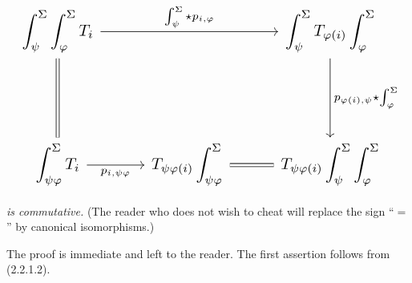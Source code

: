 \begin{equation*}
  \resizebox{\textwidth}{!}{%
    $\begin{tikzcd}[ampersand replacement=\&,column sep=2.8em,row sep=5.0em]
      \displaystyle\int_\psi^\Sigma\int_\varphi^\Sigma T_i
        \arrow[rr,"{\int_\psi^\Sigma\star p_{i,\varphi}}"]
        \arrow[d,equal]
        \& {}
        \& \displaystyle\int_\psi^\Sigma T_{\varphi(i)}\int_\varphi^\Sigma
          \arrow[d,"{p_{\varphi(i),\psi}\star\int_\varphi^\Sigma}"] \\
      \displaystyle\int_{\psi\varphi}^\Sigma T_i
        \arrow[r,"{p_{i,\psi\varphi}}"']
        \& \displaystyle T_{\psi\varphi(i)}\int_{\psi\varphi}^\Sigma
          \arrow[r,equal]
        \& \displaystyle T_{\psi\varphi(i)}\int_\psi^\Sigma\int_\varphi^\Sigma
    \end{tikzcd}$%
  }
\end{equation*}

\emph{is commutative.} (The reader who does not wish to cheat will replace
the sign ``$=$'' by canonical isomorphisms.)

The proof is immediate and left to the reader. The first assertion
follows from (2.2.1.2).
